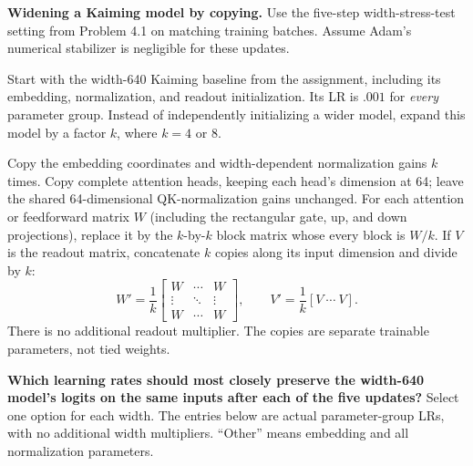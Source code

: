\clearpage
\begin{examplequestion}[difficulty=easy]
\label{ex:a2-copied-width}
\textbf{Widening a Kaiming model by copying.}
Use the five-step width-stress-test setting from Problem 4.1 on matching
training batches. Assume Adam's numerical stabilizer is negligible for these updates.

Start with the width-640 Kaiming baseline from the assignment, including its
embedding, normalization, and readout initialization. Its LR is $.001$ for
\emph{every} parameter group. Instead of independently initializing a wider
model, expand this model by a factor $k$, where $k=4$ or $8$.

Copy the embedding coordinates and width-dependent normalization gains $k$
times. Copy complete attention heads, keeping each head's dimension at 64;
leave the shared 64-dimensional QK-normalization gains unchanged.
For each attention or feedforward matrix $W$ (including the rectangular
gate, up, and down projections), replace it by the
$k$-by-$k$ block matrix whose every block is $W/k$. If $V$ is the readout
matrix, concatenate $k$ copies along its input dimension and divide by $k$:
\[
 W'=\frac1k\begin{bmatrix}W&\cdots&W\\\vdots&\ddots&\vdots\\W&\cdots&W\end{bmatrix},
 \qquad V'=\frac1k[V\ \cdots\ V].
\]
There is no additional readout multiplier. The copies are separate trainable
parameters, not tied weights.

\textbf{Which learning rates should most closely preserve the width-640
model's logits on the same inputs after each of the five updates?}
Select one option for each width. The entries below are actual parameter-group
LRs, with no additional width multipliers. ``Other'' means embedding and all
normalization parameters.


\end{examplequestion}
